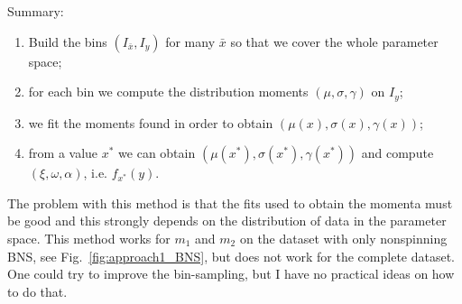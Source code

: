 \documentclass[prd,aps,twocolumn,a4paper,showkeys,nofootinbib]{revtex4-1}
\def\Ix{{I_{\bar{x}}}}
\def\Iy{{I_y}}
\begin{document}
Summary:
\begin{enumerate}
	\item Build the bins $(\Ix,\Iy)$ for many $\bar{x}$ so that we cover the whole parameter space;
	\item for each bin we compute the distribution moments $(\mu,\sigma,\gamma)$ on $\Iy$;
	\item we fit the moments found in order to obtain $(\mu(x),\sigma(x),\gamma(x))$;
	\item from a value $x^*$ we can obtain $(\mu(x^*),\sigma(x^*),\gamma(x^*))$ and 
	compute $(\xi, \omega, \alpha)$, i.e. $f_{x^*}(y)$.
\end{enumerate}

The problem with this method is that the fits used to obtain the momenta must be good and this strongly depends
on the distribution of data in the parameter space. This method works for $m_1$ and $m_2$ on the dataset with
only nonspinning BNS, see Fig.~\ref{fig:approach1_BNS}, but does not work for the complete dataset.
One could try to improve the bin-sampling, but I have no practical ideas on how to do that. 
\end{document}
